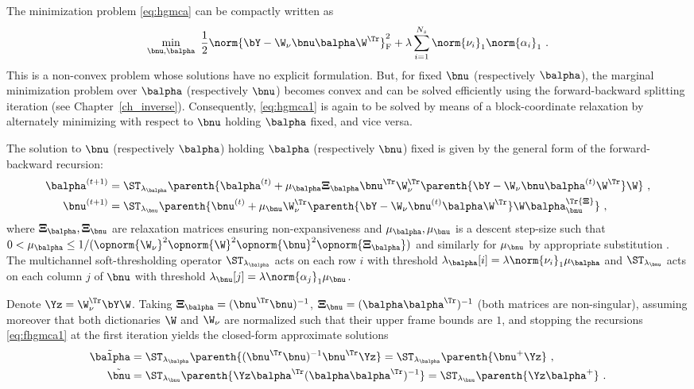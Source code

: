 The minimization problem \eqref{eq:hgmca} can be compactly written as
\begin{equation}
\label{eq:hgmca1}
\min_{\bnu,\balpha} ~ \frac{1}{2}\norm{{\bY} -  \W_\nu\bnu\balpha\W^\Tr}_\mathrm{F}^2 + \lambda \sum_{i=1}^{N_s} \norm{\nu_i}_1 \norm{\alpha_i}_1 ~ .
\end{equation}
This is a non-convex problem whose solutions have no explicit formulation. But, for fixed $\bnu$ (respectively $\balpha$), the marginal minimization problem over $\balpha$ (respectively $\bnu$) becomes convex and can be solved efficiently using the forward-backward splitting iteration (see Chapter~\ref{ch_inverse}). Consequently, \eqref{eq:hgmca1} is again to be solved by means of a block-coordinate relaxation by alternately minimizing with respect to $\bnu$ holding $\balpha$ fixed, and vice versa. 

The solution to $\bnu$ (respectively $\balpha$) holding $\balpha$ (respectively $\bnu$) fixed is given by the general form of the forward-backward recursion:
\begin{equation}
\label{eq:fhgmca1}
\begin{split}
\balpha^{(t+1)} &=  \ST_{\lambda_{\balpha}}\parenth{\balpha^{(t)} + \mu_{\balpha}{\boldsymbol \Xi}_{\balpha}\bnu^\Tr\W_\nu^\Tr\parenth{\bY - \W_\nu\bnu\balpha^{(t)}\W^\Tr}\W} ~, \\
\bnu^{(t+1)}    &=  \ST_{\lambda_{\bnu}}\parenth{\bnu^{(t)} + \mu_{\bnu}\W_\nu^\Tr\parenth{\bY - \W_\nu\bnu^{(t)}\balpha\W^\Tr}\W\balpha^\Tr{\boldsymbol \Xi}_{\bnu}} ~,  
\end{split}
\end{equation}
where ${\boldsymbol \Xi}_{\balpha},{\boldsymbol \Xi}_{\bnu}$ are relaxation matrices ensuring non-expansiveness and $\mu_{\balpha},\mu_{\bnu}$ is a descent step-size such that $0 < \mu_{\balpha} \leq 1/(\opnorm{\W_\nu}^2\opnorm{\W}^2\opnorm{\bnu}^2\opnorm{{\boldsymbol \Xi}_{\balpha}})$ and similarly for $\mu_{\bnu}$ by appropriate substitution \citep{ChenRockafellar97}. The multichannel soft-thresholding operator $\ST_{\lambda_{\balpha}}$ acts on each row $i$ with threshold $\lambda_{\balpha}[i]=\lambda\norm{\nu_i}_1\mu_{\balpha}$ and $\ST_{\lambda_{\bnu}}$ acts on each column $j$ of $\bnu$ with threshold $\lambda_{\bnu}[j]=\lambda\norm{\alpha_j}_1\mu_{\bnu}$.

Denote $\Yz = \W_\nu^\Tr\bY\W$. Taking ${\boldsymbol \Xi}_{\balpha} = (\bnu^\Tr\bnu)^{-1}$, ${\boldsymbol \Xi}_{\bnu} = (\balpha\balpha^\Tr)^{-1}$ (both matrices are non-singular), assuming moreover that both dictionaries $\W$ and $\W_\nu$ are normalized such that their upper frame bounds are $1$, and stopping the recursions \eqref{eq:fhgmca1} at the first iteration yields the closed-form approximate solutions
\begin{equation}
\label{eq:fhgmca2}
\begin{split}
\tilde{\balpha} &=  \ST_{\lambda_{\balpha}}\parenth{(\bnu^\Tr\bnu)^{-1}\bnu^\Tr\Yz} = \ST_{\lambda_{\balpha}}\parenth{\bnu^+\Yz}~, \\
\tilde{\bnu}    &=  \ST_{\lambda_{\bnu}}\parenth{\Yz\balpha^\Tr(\balpha\balpha^\Tr)^{-1}} = \ST_{\lambda_{\bnu}}\parenth{\Yz\balpha^+}~.  
\end{split}
\end{equation}

